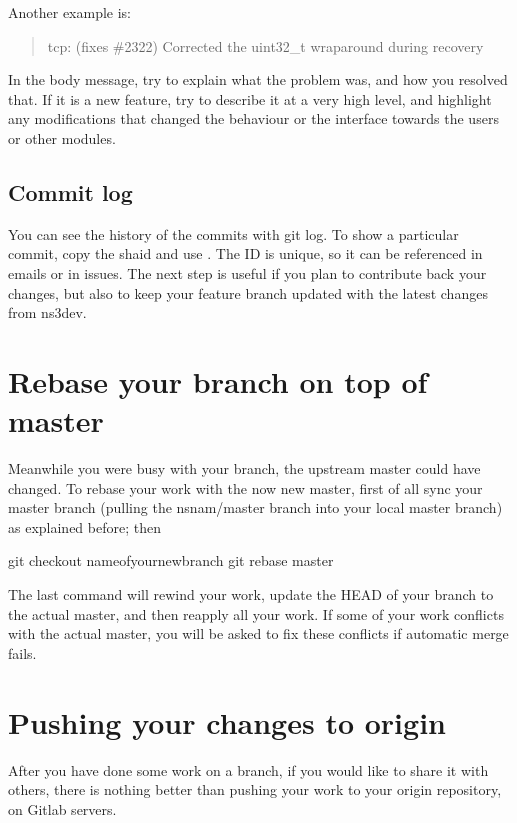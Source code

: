 \documentclass[letterpaper,10pt,english]{sphinxmanual}
\renewcommand{\sphinxcode}[1]{\texttt{\small{#1}}}
\begin{document}
Another example is:
\begin{quote}

tcp: (fixes \#2322) Corrected the uint32\_t wraparound during recovery
\end{quote}

In the body message, try to explain what the problem was, and how you resolved that. If it is a new feature, try to describe it at a very high level, and highlight any modifications that changed the behaviour or the interface towards the users or other modules.


\subsection{Commit log}
\label{\detokenize{working-with-git:commit-log}}
You can see the history of the commits with git log. To show a particular commit, copy the sha\sphinxhyphen{}id and use \sphinxcode{\sphinxupquote{git show \textless{}sha\sphinxhyphen{}id\textgreater{}}}. The ID is unique, so it can be referenced in emails or in issues. The next step is useful if you plan to contribute back your changes, but also to keep your feature branch updated with the latest changes from ns\sphinxhyphen{}3\sphinxhyphen{}dev.


\section{Rebase your branch on top of master}
\label{\detokenize{working-with-git:rebase-your-branch-on-top-of-master}}
Meanwhile you were busy with your branch, the upstream master could have changed. To rebase your work with the now new master, first of all sync your master branch (pulling the nsnam/master branch into your local master branch) as explained before; then

\begin{sphinxVerbatim}[commandchars=\\\{\}]
\PYGZdl{} git checkout \PYG{o}{[}name\PYGZus{}of\PYGZus{}your\PYGZus{}new\PYGZus{}branch\PYG{o}{]}
\PYGZdl{} git rebase master
\end{sphinxVerbatim}

The last command will rewind your work, update the HEAD of your branch to the actual master, and then re\sphinxhyphen{}apply all your work. If some of your work conflicts with the actual master, you will be asked to fix these conflicts if automatic merge fails.


\section{Pushing your changes to origin}
\label{\detokenize{working-with-git:pushing-your-changes-to-origin}}
After you have done some work on a branch, if you would like to share it with others, there is nothing better than pushing your work to your origin repository, on Gitlab servers.
\end{document}
